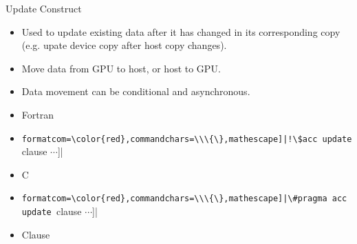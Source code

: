 \documentclass[c,mathserif,compress,xcolor=svgnames]{beamer}
\newcommand{\Verbred}[1]{\Verb[formatcom=\color{red},commandchars=\\\{\},mathescape]|#1|}
\begin{document}
\begin{frame}[fragile]{\small Update Construct}
  \begin{itemize}
    \item Used to update existing data after it has changed in its corresponding copy (e.g. upate device copy after host copy changes).
    \item Move data from GPU to host, or host to GPU.
    \item Data movement can be conditional and asynchronous.
    \item Fortran
    \item[] \Verbred{!\$acc update [clause $\cdots$]}
    \item C
    \item[] \Verbred{\#pragma acc update [clause $\cdots$]}
    \item Clause
  \end{itemize}
\end{frame}

\begin{frame}[fragile]
  \begin{columns}[t]
     
     
  \end{columns}
\end{frame}
\end{document}
